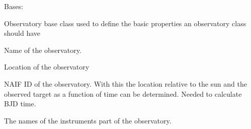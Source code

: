 \documentclass[a4paper,10pt,english]{sphinxmanual}
\begin{document}
\begin{fulllineitems}
\label{\detokenize{cascade.instruments:cascade.instruments.instruments.ObservatoryBase}}
Bases: 

Observatory base class used to define the basic properties an observatory
class should have

\begin{fulllineitems}
\label{\detokenize{cascade.instruments:cascade.instruments.instruments.ObservatoryBase.name}}
Name of the observatory.

\end{fulllineitems}


\begin{fulllineitems}
\label{\detokenize{cascade.instruments:cascade.instruments.instruments.ObservatoryBase.location}}
Location of the observatory

\end{fulllineitems}


\begin{fulllineitems}
\label{\detokenize{cascade.instruments:cascade.instruments.instruments.ObservatoryBase.NAIF_ID}}
NAIF ID of the observatory. With this the location relative to the
sun and the observed target as a function of time can be determined.
Needed to calculate BJD time.

\end{fulllineitems}


\begin{fulllineitems}
\label{\detokenize{cascade.instruments:cascade.instruments.instruments.ObservatoryBase.observatory_instruments}}
The names of the instruments part of the observatory.

\end{fulllineitems}


\end{fulllineitems}
\end{document}

